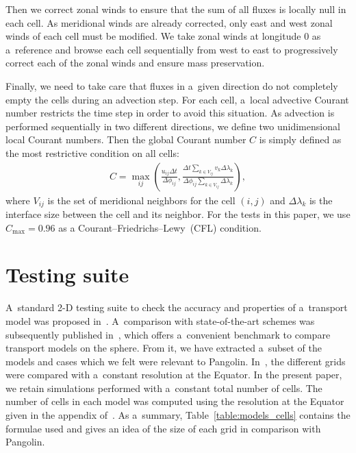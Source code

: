    Then we correct zonal winds to ensure that the sum of all fluxes is
   locally null in each cell. As meridional winds are already
   corrected, only east and west zonal winds of each cell must be
   modified. We take zonal winds at longitude $0$ as a~reference and
   browse each cell sequentially from west to east to progressively correct
   each of the zonal winds and ensure mass preservation.

   Finally, we need to take care that fluxes in a~given direction do
   not completely empty the cells during an advection step. For each
   cell, a~local advective Courant number restricts the time step in order to
   avoid this situation. As advection is performed sequentially in two
   different directions, we define two uni\-dimensional local Courant
   numbers. Then the global Courant number $C$ is simply defined as
   the most restrictive condition on all cells:
\begin{align*} C = \max_{ij} \left(\frac{u_{ij}\Delta t}{\Delta\phi_{ij}},
\frac{\Delta t\sum_{k \in V_{ij}} v_k \Delta\lambda_k }{
\Delta\phi_{ij}\sum_{k \in V_{ij}} \Delta\lambda_{k}} \right),
   \end{align*}
   where $V_{ij}$ is the set of meridional neighbors for the cell
   $(i,j)$ and $\Delta\lambda_k$ is the interface size between the
   cell and its neighbor. For the tests in this paper, we use
   $C_{\text{max}}=0.96$ as a Courant–Friedrichs--Lewy~(CFL) condition.

\section{Testing suite}
   \label{sec2:tests}

   A~standard 2-D testing suite to check the accuracy and properties
   of a~transport model was proposed
   in~\citet{Lauritzen2012}. A~comparison with state-of-the-art
   schemes was subsequently published in~\citet{Lauritzen2014}, which
   offers a~convenient benchmark to compare transport models on the
   sphere.  From it, we have extracted a~subset of the models and
   cases which we felt were relevant to
   Pangolin. In~\citet{Lauritzen2014}, the different grids were
   compared with a~constant resolution at the Equator. In the present
   paper, we retain simulations performed with a~constant total number
   of cells. The number of cells in each model was computed using the
   resolution at the Equator given in the appendix
   of~\citet{Lauritzen2014}. As a~summary,
   Table~\ref{table:models_cells} contains the formulae used and
   gives an idea of the size of each grid in comparison with
   Pangolin.

